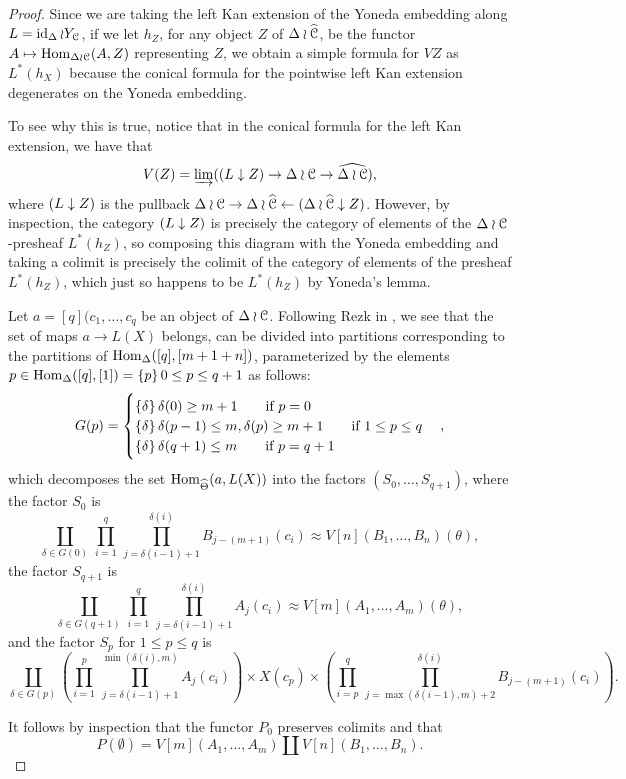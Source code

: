 \begin{proof}
Since we are taking the left Kan extension of the Yoneda embedding along \(L=\operatorname{id}_\Delta\wr Y_{\mathcal{C}}\), if we let  \(h_Z\), for any object \(Z\) of \(\Delta \wr \widehat{\mathcal{C}}\), be the functor \(A\mapsto {\operatorname{Hom}}_{\Delta\wr\mathcal{C}}(A,Z)\) representing \(Z\),  we  obtain a simple formula for \(VZ\) as \(L^\ast(h_X)\) because the conical formula for the pointwise left Kan extension degenerates on the Yoneda embedding.

To see why this is true, notice that in the conical formula for the left Kan extension, we have that \[V(Z)=\varinjlim({(L\downarrow Z)}\to \Delta\wr\mathcal{C}\to \widehat{\Delta\wr\mathcal{C}}),\] where \({(L\downarrow Z)}\) is the pullback \(\Delta\wr \mathcal{C} \to \Delta\wr\widehat{\mathcal{C}} \leftarrow {(\Delta\wr\ensuremath{\widehat{\mathcal{C}}}\downarrow Z)}\).  However, by inspection, the category \({(L\downarrow Z)}\) is precisely the category of elements of the \(\Delta\wr\mathcal{C}\)-presheaf \(L^\ast (h_Z)\), so composing this diagram with the Yoneda embedding and taking a colimit is precisely the colimit of the category of elements of the presheaf \(L^\ast(h_Z)\), which just so happens to be \(L^\ast (h_Z)\) by Yoneda's lemma.  

Let \(a=[q](c_1,\dots,c_q\) be an object of \(\Delta\wr\mathcal{C}\).  Following Rezk in \cite{rezk-theta-n-spaces}, we see that the set of maps \(a\to L(X)\) belongs, can be divided into partitions corresponding to the partitions of \({\operatorname{Hom}}_\Delta([q],[m+1+n])\), parameterized by the elements \(p\in {\operatorname{Hom}}_\Delta([q],[1])=\set{p}{0\leq p\leq q+1}\) as follows: 
\[G(p)=
\begin{cases}
\set{\delta}{\delta(0)\geq m+1}\qquad \text{if \(p=0\)}\\
\set{\delta}{\delta(p-1)\leq m, \delta(p)\geq m+1} \qquad \text{if \(1\leq p\leq q\)}\\
\set{\delta}{\delta(q+1)\leq m}\qquad \text{if \(p=q+1\)}
\end{cases},
\]
which decomposes the set \({\operatorname{Hom}}_{\widehat{\Theta}}(a,L(X))\) into the factors \((S_0,\dots,S_{q+1})\), where the factor \(S_0\) is 
\[
\coprod_{\delta\in G(0)}\,
\prod_{i=1}^q\,\prod_{j=\delta(i-1)+1}^{\delta(i)} B_{j-(m+1)}(c_i) \approx
V[n](B_1,\dots,B_n)(\theta),
\]
the factor \(S_{q+1}\) is 
\[
\coprod_{\delta\in G(q+1)}\,
\prod_{i=1}^q\, \prod_{j=\delta(i-1)+1}^{\delta(i)} A_j(c_i) \approx
  V[m](A_1,\dots, A_m)(\theta),
\]
and the factor \(S_p\) for \(1\leq p \leq q\) is 
\[
\coprod_{\delta\in G(p)}
\left(\prod_{i=1}^{p} \,\prod_{j=\delta(i-1)+1}^{\min(\delta(i),m)} A_j(c_i)
\right) \times X(c_p) \times \left(\prod_{i=p}^q \,
  \prod_{j=\max(\delta(i-1),m)+2}^{\delta(i)} B_{j-(m+1)}(c_i)\right).
\]

It follows by inspection that the functor \(P_0\) preserves colimits and that \[P(\emptyset)=V[m](A_1,\dots,A_m)\coprod V[n](B_1,\dots,B_n).\]
\end{proof}
